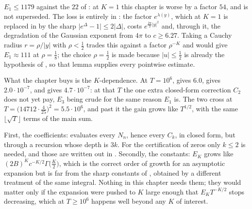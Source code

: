 \begin{remark}
\label{rem:rsg_constants}
$E_{1}\le1179$ against the $22$ of : at $K=1$ this chapter is worse by a
factor $54$, and  is not superseded.  The loss is entirely in
: the factor $e^{\lambda(y)}$, which at $K=1$ is replaced in
 by the sharp $\lvert e^{\Delta}-1\rvert\le2\lvert\Delta\rvert$, costs
$e^{\frac{2\pi}3\lvert y\rvert^{2}}$ and, through it, the degradation of the Gaussian exponent
from $4\pi$ to $c\ge6.27$.  Taking a Cauchy radius $r=\rho/\lvert y\rvert$ with $\rho<\tfrac12$
trades this against a factor $\rho^{-K}$ and would give $E_{1}\approx111$ at $\rho=\tfrac18$;
the choice $\rho=\tfrac12$ is made because $\lvert u\rvert\le\tfrac12$ is already the hypothesis
of , so that lemma supplies every pointwise estimate.

What the chapter buys is the $K$-dependence.  At $T=10^{6}$,  gives $6.0$,
 gives $2.0\cdot10^{-7}$, and  gives
$4.7\cdot10^{-7}$: at that $T$ the one extra closed-form correction $C_{2}$ does not yet pay,
$E_{3}$ being crude for the same reason $E_{1}$ is.  The two cross at
$T=\bigl(14712\cdot\tfrac4{25}\bigr)^{2}=5.5\cdot10^{6}$, and past it the gain grows like
$T^{1/2}$, with the same $\lfloor\sqrt T\rfloor$ terms of the main sum.
\end{remark}

\begin{remark}
\label{rem:rsg_next}
First, the coefficients:  evaluates every $N_{n}$, hence
every $C_{k}$, in closed form, but through a recursion whose depth is $3k$.  For the
certification of zeros only $k\le2$ is needed, and those are written out in
.  Secondly, the constants: $E_{K}$ grows like
$(2B)^{K}c^{-K/2}\Gamma\bigl(\tfrac K2\bigr)$, which is the correct order of growth for an
asymptotic expansion but is far from the sharp constants of \cite{Gabcke}, obtained by a
different treatment of the same integral.  Nothing in this chapter needs them; they would matter
only if the expansion were pushed to $K$ large enough that $E_{K}T^{-K/2}$ stops decreasing,
which at $T\ge10^{6}$ happens well beyond any $K$ of interest.
\end{remark}
